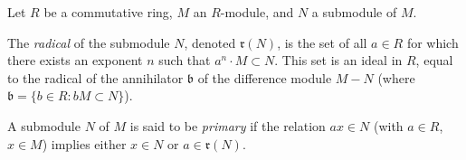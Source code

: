 Let $R$ be a commutative ring, $M$ an $R$-module, and $N$ a submodule of $M$.

The \textit{radical} of the submodule $N$, denoted $\mathfrak{r}(N)$, is the set of all $a \in R$ for which there exists an exponent $n$ such that $a^n \cdot M \subset N$. This set is an ideal in $R$, equal to the radical of the annihilator $\mathfrak{b}$ of the difference module $M - N$ (where $\mathfrak{b} = \{b \in R : bM \subset N\}$).

A submodule $N$ of $M$ is said to be \textit{primary} if the relation $ax \in N$ (with $a \in R$, $x \in M$) implies either $x \in N$ or $a \in \mathfrak{r}(N)$.
